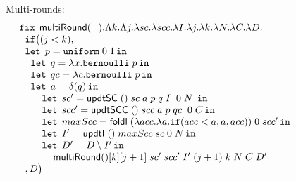 \documentclass[a4paper,11pt]{article}
\theoremstyle{definition}
\begin{document}
\begin{figure}

Multi-rounds:
\[
\begin{array}{l}
 \mathop{\mathtt{fix}} \;  \mathsf{multiRound}(\_). \Lambda k. \Lambda j. \lambda sc. \lambda scc. \lambda
  I. \lambda j. \lambda k.  \lambda N. \lambda C. \lambda D.\\
 \hspace{.2cm} \mathtt{if}   \big (   (j < k)  ,  \\
  \hspace{.2cm} \mathop{\mathtt{let}} \; p = \mathtt{uniform} \; 0 \; 1 \mathop{ \mathtt{in}} \\
  \hspace{0.4cm} \mathop{\mathtt{let}} \; q = \lambda x. \mathtt{bernoulli} \; p \mathop{ \mathtt{in}} \\
 \hspace{0.4cm} \mathop{\mathtt{let}} \; qc = \lambda c. \mathtt{bernoulli} \; p \mathop{ \mathtt{in}} \\
 \hspace{0.4cm} \mathop{\mathtt{let}} \; a = \delta (q)  \mathop{ \mathtt{in}} \\
 \hspace{0.8cm} \mathop{\mathtt{let}} \; sc' =  \mathsf{updtSC} \; () \; sc  \; a \; p
 \; q \; I \;  \; 0 \;  N
  \;  \mathop{ \mathtt{in}} \\
\hspace{0.8cm} \mathop{\mathtt{let}} \; scc' =  \mathsf{updtSCC} \; () \; scc \; a \; p
 \; qc \;  \; 0 \;  C \mathop{ \mathtt{in}} \\
\hspace{0.8cm} \mathop{\mathtt{let}} \; maxScc =  \mathsf{foldl} \; (\lambda acc. \lambda a. \mathtt{if} ( acc < a, a, acc)) \; 0 \; scc' \mathop{ \mathtt{in}} \\
\hspace{0.8cm} \mathop{\mathtt{let}} \; I' =  \mathsf{updtI}  \; () \; maxScc \; sc
  \; 0 \; N  \mathop{ \mathtt{in}} \\
  \hspace{0.8cm} \mathop{\mathtt{let}} \; D' =  D \setminus I' \mathop{ \mathtt{in}} \\
  \hspace{1.2cm} \mathsf{multiRound} () [k] [j+1]  \; sc' \; scc' \; I'
  \; (j+1) \;  k \; N \; C \; D'\\ 
\hspace{0.2cm}   ,     D  \big ) \\
 
\end{array}
\]


\end{figure}
\end{document}

